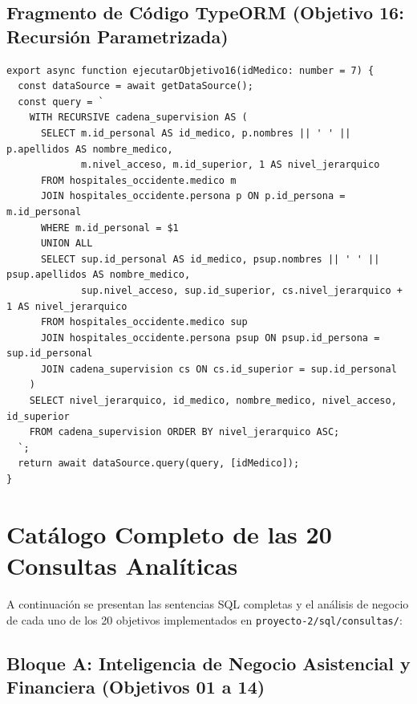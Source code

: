 \documentclass[11pt,a4paper]{article}
\begin{document}
\subsection{Fragmento de Código TypeORM (Objetivo 16: Recursión Parametrizada)}
\begin{lstlisting}[style=tsstyle]
export async function ejecutarObjetivo16(idMedico: number = 7) {
  const dataSource = await getDataSource();
  const query = `
    WITH RECURSIVE cadena_supervision AS (
      SELECT m.id_personal AS id_medico, p.nombres || ' ' || p.apellidos AS nombre_medico,
             m.nivel_acceso, m.id_superior, 1 AS nivel_jerarquico
      FROM hospitales_occidente.medico m
      JOIN hospitales_occidente.persona p ON p.id_persona = m.id_personal
      WHERE m.id_personal = $1
      UNION ALL
      SELECT sup.id_personal AS id_medico, psup.nombres || ' ' || psup.apellidos AS nombre_medico,
             sup.nivel_acceso, sup.id_superior, cs.nivel_jerarquico + 1 AS nivel_jerarquico
      FROM hospitales_occidente.medico sup
      JOIN hospitales_occidente.persona psup ON psup.id_persona = sup.id_personal
      JOIN cadena_supervision cs ON cs.id_superior = sup.id_personal
    )
    SELECT nivel_jerarquico, id_medico, nombre_medico, nivel_acceso, id_superior
    FROM cadena_supervision ORDER BY nivel_jerarquico ASC;
  `;
  return await dataSource.query(query, [idMedico]);
}
\end{lstlisting}

\newpage

\section{Catálogo Completo de las 20 Consultas Analíticas}
A continuación se presentan las sentencias SQL completas y el análisis de negocio de cada uno de los 20 objetivos implementados en \texttt{proyecto-2/sql/consultas/}:

\subsection{Bloque A: Inteligencia de Negocio Asistencial y Financiera (Objetivos 01 a 14)}
\end{document}
